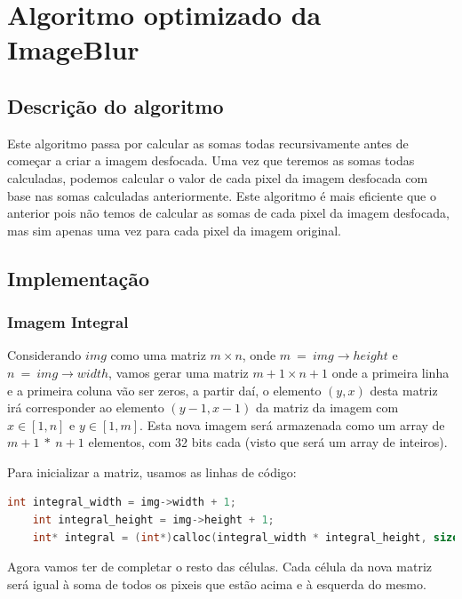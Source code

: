 \section{Algoritmo optimizado da ImageBlur}
\label{sec:imageblur/optimal}

\subsection{Descrição do algoritmo}

Este algoritmo passa por calcular as somas todas recursivamente antes de começar a criar a imagem desfocada. Uma vez que teremos as somas todas calculadas, podemos calcular o valor de cada pixel da imagem desfocada com base nas somas calculadas anteriormente. Este algoritmo é mais eficiente que o anterior pois não temos de calcular as somas de cada pixel da imagem desfocada, mas sim apenas uma vez para cada pixel da imagem original.

\subsection{Implementação}

\subsubsection{Imagem Integral}

Considerando $img$ como uma matriz $m \times n$, onde $m~=~img\rightarrow height$ e $n~=~img\rightarrow width$, vamos gerar uma matriz $m+1 \times n+1$ onde a primeira linha e a primeira coluna vão ser zeros, a partir daí, o elemento $(y,x)$ desta matriz irá corresponder ao elemento $(y-1,x-1)$ da matriz da imagem com $x\in[1,n]$ e $y\in[1,m]$. Esta nova imagem será armazenada como um array de $m+1~*~n+1$ elementos, com 32 bits cada (visto que será um array de inteiros).

Para inicializar a matriz, usamos as linhas de código:

\begin{lstlisting}[language=C]
    int integral_width = img->width + 1;
    int integral_height = img->height + 1;
    int* integral = (int*)calloc(integral_width * integral_height, sizeof(int));
\end{lstlisting}

Agora vamos ter de completar o resto das células. Cada célula da nova matriz será igual à soma de todos os pixeis que estão acima e à esquerda do mesmo.


